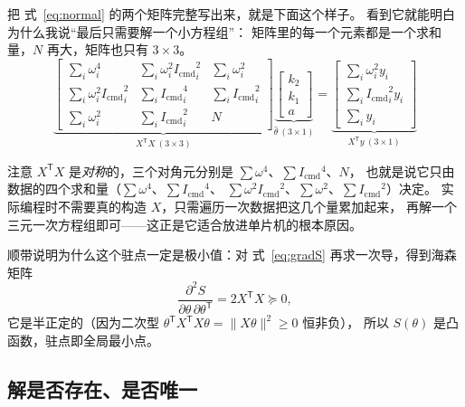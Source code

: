 \documentclass[cn,blue,11pt,device=normal]{elegantnote}
\newcommand{\Icmd}{I_{\mathrm{cmd}}{}}
\newcommand{\fref}[1]{式~\eqref{#1}}
\begin{document}
把 \fref{eq:normal} 的两个矩阵完整写出来，就是下面这个样子。
看到它就能明白为什么我说“最后只需要解一个小方程组”：
矩阵里的每一个元素都是一个求和量，$N$ 再大，矩阵也只有 $3\times3$。
\begin{equation}\label{eq:normalexpanded}
  \underbrace{
  \begin{bmatrix}
    \sum_i \omega_i^{4} & \sum_i \omega_i^{2}{\Icmd}_i^{2} & \sum_i \omega_i^{2}\\[6pt]
    \sum_i \omega_i^{2}{\Icmd}_i^{2} & \sum_i {\Icmd}_i^{4} & \sum_i {\Icmd}_i^{2}\\[6pt]
    \sum_i \omega_i^{2} & \sum_i {\Icmd}_i^{2} & N
  \end{bmatrix}}_{X^{\mathsf T}X\ (3\times3)}
  \underbrace{
  \begin{bmatrix} k_2\\[4pt] k_1\\[4pt] a\end{bmatrix}}_{\hat\theta\ (3\times1)}
  =
  \underbrace{
  \begin{bmatrix} \sum_i \omega_i^{2}y_i\\[6pt] \sum_i {\Icmd}_i^{2}y_i\\[6pt] \sum_i y_i\end{bmatrix}
  }_{X^{\mathsf T}y\ (3\times1)}
\end{equation}

注意 $X^{\mathsf T}X$ 是\emph{对称}的，三个对角元分别是
$\sum\omega^4$、$\sum\Icmd^4$、$N$，
也就是说它只由数据的四个求和量（$\sum\omega^4$、$\sum\Icmd^4$、
$\sum\omega^2\Icmd^2$、$\sum\omega^2$、$\sum\Icmd^2$）决定。
实际编程时不需要真的构造 $X$，只需遍历一次数据把这几个量累加起来，
再解一个三元一次方程组即可——这正是它适合放进单片机的根本原因。

顺带说明为什么这个驻点一定是极小值：对 \fref{eq:gradS} 再求一次导，得到海森矩阵
\begin{equation}
  \frac{\partial^2 S}{\partial\theta\,\partial\theta^{\mathsf T}} = 2X^{\mathsf T}X \succeq 0 ,
\end{equation}
它是半正定的（因为二次型
$\theta^{\mathsf T}X^{\mathsf T}X\theta=\lVert X\theta\rVert^2\ge0$ 恒非负），
所以 $S(\theta)$ 是凸函数，驻点即全局最小点。

\subsection{解是否存在、是否唯一}
\end{document}
